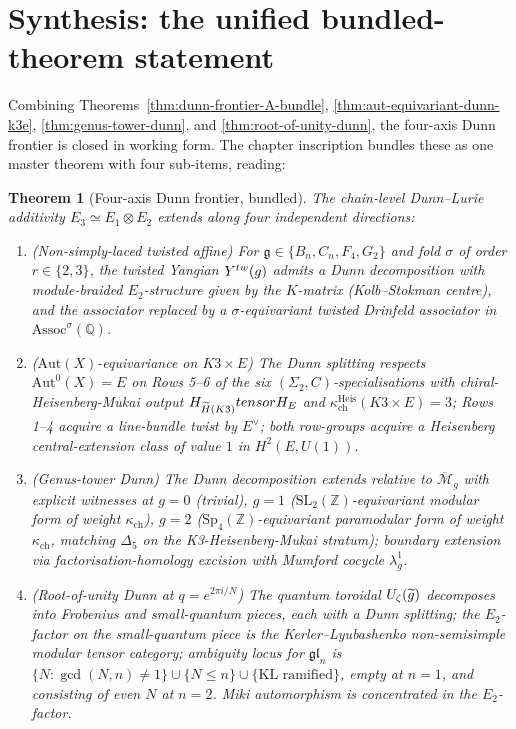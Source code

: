 \documentclass[11pt]{article}
\newtheorem{theorem}{Theorem}[section]
\newcommand{\Eone}{E_{1}}
\newcommand{\Etwo}{E_{2}}
\newcommand{\Ethree}{E_{3}}
\newcommand{\Z}{\mathbb{Z}}
\newcommand{\Q}{\mathbb{Q}}
\newcommand{\cM}{\mathcal{M}}
\newcommand{\cU}{\mathcal{U}}
\newcommand{\Aut}{\mathrm{Aut}}
\newcommand{\frakg}{\mathfrak{g}}
\newcommand{\fgl}{\mathfrak{gl}}
\begin{document}
\section{Synthesis: the unified bundled-theorem statement}
\label{sec:synthesis}

Combining Theorems~\ref{thm:dunn-frontier-A-bundle},
\ref{thm:aut-equivariant-dunn-k3e}, \ref{thm:genus-tower-dunn}, and
\ref{thm:root-of-unity-dunn}, the four-axis Dunn frontier is closed in
working form. The chapter inscription bundles these as one master
theorem with four sub-items, reading:

\begin{theorem}[Four-axis Dunn frontier, bundled]
  \label{thm:bundled-four-axis}
  The chain-level Dunn--Lurie additivity $\Ethree \simeq \Eone \otimes
  \Etwo$ extends along four independent directions:
  \begin{enumerate}[label=\textbf{(\Alph*)}, leftmargin=*]
  \item (Non-simply-laced twisted affine) For
    $\frakg \in \{B_n, C_n, F_4, G_2\}$ and fold $\sigma$ of order
    $r \in \{2, 3\}$, the twisted Yangian $Y^{\mathrm{tw}}(\widehat\frakg)$
    admits a Dunn decomposition with module-braided $\Etwo$-structure
    given by the $K$-matrix (Kolb--Stokman centre), and the associator
    replaced by a $\sigma$-equivariant twisted Drinfeld associator
    in $\mathrm{Assoc}^\sigma(\Q)$.
  \item ($\Aut(X)$-equivariance on $K3 \times E$) The Dunn splitting
    respects $\Aut^0(X) = E$ on Rows 5--6 of the six
    $(\Sigma_2, C)$-specialisations with chiral-Heisenberg-Mukai output
    $H_{\widetilde H(K3)} tensor H_E$ and
    $\kappa_{\mathrm{ch}}^{\mathrm{Heis}}(K3 \times E) = 3$; Rows 1--4
    acquire a line-bundle twist by $E^\vee$; both row-groups acquire a
    Heisenberg central-extension class of value $1$ in
    $H^2(E, U(1))$.
  \item (Genus-tower Dunn) The Dunn decomposition extends relative to
    $\overline{\cM}_g$ with explicit witnesses at $g = 0$ (trivial),
    $g = 1$ ($\mathrm{SL}_2(\Z)$-equivariant modular form of weight
    $\kappa_{\mathrm{ch}}$), $g = 2$ ($\mathrm{Sp}_4(\Z)$-equivariant
    paramodular form of weight $\kappa_{\mathrm{ch}}$, matching
    $\Delta_5$ on the K3-Heisenberg-Mukai stratum); boundary extension
    via factorisation-homology excision with Mumford cocycle
    $\lambda_g^1$.
  \item (Root-of-unity Dunn at $q = e^{2\pi i/N}$) The quantum toroidal
    $\cU_\zeta(\widetilde{\widehat\frakg})$ decomposes into Frobenius
    and small-quantum pieces, each with a Dunn splitting; the
    $\Etwo$-factor on the small-quantum piece is the
    Kerler--Lyubashenko non-semisimple modular tensor category;
    ambiguity locus for $\fgl_n$ is
    $\{N : \gcd(N, n) \neq 1\} \cup \{N \leq n\} \cup \{\text{KL
    ramified}\}$, empty at $n = 1$, and consisting of even $N$ at
    $n = 2$. Miki automorphism is concentrated in the $\Etwo$-factor.
  \end{enumerate}
\end{theorem}
\end{document}
